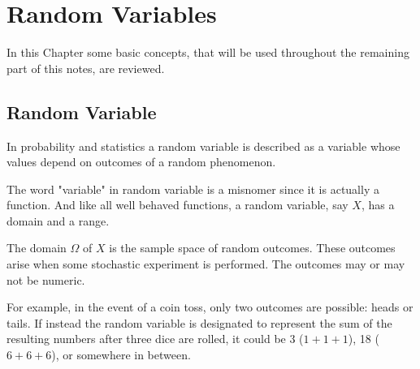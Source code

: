 \chapter{Random Variables}
\label{fundamentals}

In this Chapter some basic concepts, that will be used throughout the remaining part of this notes, are reviewed.

\section{Random Variable}
\label{random-variables}

In probability and statistics a random variable is described as a variable whose values depend on outcomes of a random phenomenon. 
%
%
%

The word "variable" in random variable is a misnomer since it is actually a function. And like all well behaved functions, a random variable, say $X$, has a domain and a range.

The domain $\Omega$ of $X$ is the sample space of random outcomes. These outcomes arise when some stochastic experiment is performed. The outcomes may or may not be numeric. 

For example, in the event of a coin toss, only two outcomes are possible: heads or tails. If instead the random variable is designated to represent the sum of the resulting numbers after three dice are rolled, it could be 3 ($1 + 1+ 1$), 18 ($6 + 6 + 6$), or somewhere in between.

